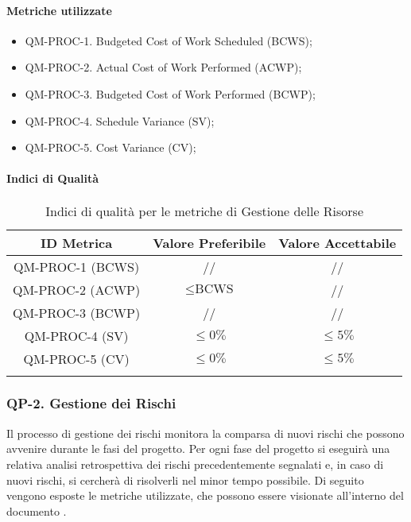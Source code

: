 		\paragraph{Metriche utilizzate}

			\begin{itemize}
				\item QM-PROC-1. Budgeted Cost of Work Scheduled (BCWS);
				\item QM-PROC-2. Actual Cost of Work Performed (ACWP);
				\item QM-PROC-3. Budgeted Cost of Work Performed (BCWP);
				\item QM-PROC-4. Schedule Variance (SV);
				\item QM-PROC-5. Cost Variance (CV);
			\end{itemize}

		\paragraph{Indici di Qualità}

			\begin{center}
				\begin{longtable}{|c|c|c|}
				\hline
				\rowcolor{lighter-grayer}
				\textbf{ID Metrica} & \textbf{Valore Preferibile} & \textbf{Valore Accettabile}\\
				\hline
				\endfirsthead
				\hline
				QM-PROC-1 (BCWS) & // & // \\
				\hline
				QM-PROC-2 (ACWP) & \( \le \text{BCWS}\) & // \\
				\hline
				QM-PROC-3 (BCWP) & // & // \\
				\hline
				QM-PROC-4 (SV) & \(\le 0\%\) & \(\le 5\%\) \\
				\hline
				QM-PROC-5 (CV) & \(\le 0\%\) & \(\le 5\%\) \\
				\hline
				\caption{Indici di qualità per le metriche di Gestione delle Risorse}
				\end{longtable}
			\end{center}

	\subsubsection{QP-2. Gestione dei Rischi}

		Il processo di gestione dei rischi monitora la comparsa di nuovi rischi che possono avvenire durante le fasi del progetto.
		Per ogni fase del progetto si eseguirà una relativa analisi retrospettiva dei rischi precedentemente segnalati e, in caso di nuovi rischi, si cercherà di risolverli nel minor tempo possibile.
		Di seguito vengono esposte le metriche utilizzate, che possono essere visionate all'interno del documento .

